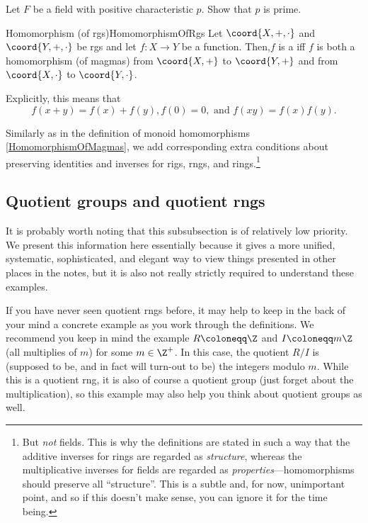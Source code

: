 \begin{exr}{}{}
Let $F$ be a field with positive characteristic $p$.  Show that $p$ is prime.
\end{exr}
\begin{dfn}{Homomorphism (of rgs)}{HomomorphismOfRgs}
Let $\coord{X,+,\cdot}$ and $\coord{Y,+,\cdot}$ be rgs and let $f\colon X\rightarrow Y$ be a function.  Then,$f$ is a  iff $f$ is both a homomorphism (of magmas) from $\coord{X,+}$ to $\coord{Y,+}$ and from $\coord{X,\cdot}$ to $\coord{Y,\cdot}$.
\begin{rmk}
Explicitly, this means that
\begin{equation*}
f(x+y)=f(x)+f(y),f(0)=0,\text{ and }f(xy)=f(x)f(y).
\end{equation*}
\end{rmk}
\begin{rmk}
Similarly as in the definition of monoid homomorphisms \cref{HomomorphismOfMagmas}, we add corresponding extra conditions about preserving identities and inverses for rigs, rngs, and rings.\footnote{But \emph{not} fields.  This is why the definitions are stated in such a way that the additive inverses for rings are regarded as \emph{structure}, whereas the multiplicative inverses for fields are regarded as \emph{properties}---homomorphisms should preserve all ``structure''.  This is a subtle and, for now, unimportant point, and so if this doesn't make sense, you can ignore it for the time being.}
\end{rmk}
\end{dfn}

\subsection{Quotient groups and quotient rngs}

It is probably worth noting that this subsubsection is of relatively low priority.  We present this information here essentially because it gives a more unified, systematic, sophisticated, and elegant way to view things presented in other places in the notes, but it is also not really strictly required to understand these examples.

If you have never seen quotient rngs before, it may help to keep in the back of your mind a concrete example as you work through the definitions.  We recommend you keep in mind the example $R\coloneqq \Z$ and $I\coloneqq m\Z$ (all multiplies of $m$) for some $m\in \Z ^+$.  In this case, the quotient $R/I$ is (supposed to be, and in fact will turn-out to be) the integers modulo $m$.  While this is a quotient rng, it is also of course a quotient group (just forget about the multiplication), so this example may also help you think about quotient groups as well.

